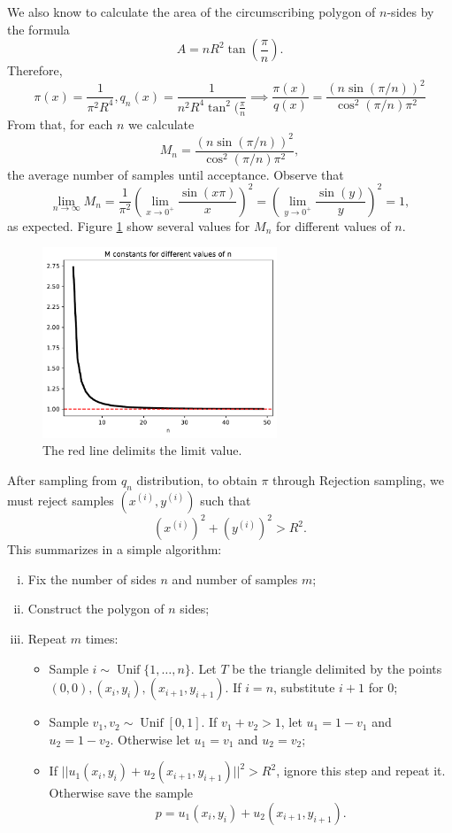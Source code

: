 \documentclass[a4paper,10pt, notitlepage]{report}
\begin{document}
We also know to calculate the area of the circumscribing polygon of $n$-sides
by the formula \cite{efunda2021formula}
$$
A = nR^2\tan\left(\frac{\pi}{n}\right).
$$
Therefore, 
$$
\pi(x) = \frac{1}{\pi^2R^4}, q_n(x) = \frac{1}{n^2R^4\tan^2(\frac{\pi}{n}} \implies \frac{\pi(x)}{q(x)} =
\frac{(n\sin(\pi/n))^2}{\cos^2(\pi/n)\pi^2}
$$
From that, for each $n$ we calculate
$$M_n = \frac{(n\sin(\pi/n))^2}{\cos^2(\pi/n)\pi^2},$$
the average number of samples until acceptance. Observe that 
$$
\lim_{n\to \infty} M_n = \frac{1}{\pi^2} \left(\lim_{x \to 0^+} \frac{\sin(x\pi)}{x}\right)^2
= \left(\lim_{y \to 0^+} \frac{\sin(y)}{y}\right)^2 = 1,
$$
as expected. Figure \ref{fig:figure7} show several values for $M_n$ for
different values of $n$. 

\begin{figure}[htpb]
    \centering
    \includegraphics[width=7cm]{images/figure7.pdf}
    \caption{\label{fig:figure7}The red line delimits the limit value.}
\end{figure}

After sampling from $q_n$ distribution, to obtain $\pi$ through Rejection
sampling, we must reject samples $(x^{(i)}, y^{(i)})$ such that 
$$(x^{(i)})^2 + (y^{(i)})^2 > R^2.$$ This summarizes in a simple algorithm: 

\begin{enumerate}[(i)]
    \item Fix the number of sides $n$ and number of samples $m$;
    \item Construct the polygon of $n$ sides; 
    \item Repeat $m$ times: 
    \begin{itemize}
        \item Sample $i \sim \operatorname{Unif}\{1, \dots, n\}$. Let $T$ be the
        triangle delimited by the points $(0,0), (x_i, y_i), (x_{i+1}, y_{i+1})$.
        If $i=n$, substitute $i+1$ for $0$; 
        \item Sample $v_1, v_2 \sim \operatorname{Unif}[0,1]$. If $v_1 + v_2 >
        1$, let $u_1 = 1 - v_1$ and $u_2 = 1 - v_2$. Otherwise let $u_1 = v_1$
        and $u_2 = v_2$; 
        \item If $||u_1(x_i, y_i) + u_2(x_{i+1}, y_{i+1})||^2 > R^2$, ignore
        this step and repeat it. Otherwise save the sample 
        $$p = u_1(x_i, y_i) + u_2(x_{i+1}, y_{i+1}).$$
    \end{itemize} 
\end{enumerate}
\end{document}
